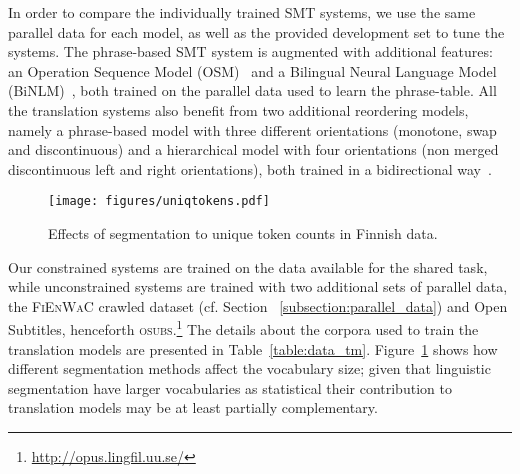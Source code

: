 \documentclass[postprint]{flammie}
\begin{document}
In order to compare the individually trained SMT systems, we use the same parallel data for each model, as well as the provided development set to tune the systems. The phrase-based SMT system is augmented with additional features: an Operation Sequence Model (OSM)~\cite{durrani2011joint} and a Bilingual Neural Language Model (BiNLM)~\cite{devlin2014binlm}, both trained on the parallel data used to learn the phrase-table. All the translation systems also benefit from two additional reordering models, namely a phrase-based model with three different orientations (monotone, swap and discontinuous) and a hierarchical model with four orientations (non merged discontinuous left and right orientations), both trained in a bidirectional way~\cite{koehn2005edinburgh,galley2008simple}.
%

\begin{figure}
\centering
\texttt{[image: figures/uniqtokens.pdf]}
	\caption{Effects of segmentation to unique token counts in Finnish data.
	\label{figure:segmentation_effects}
	}
\end{figure}
%

Our constrained systems are trained on the data available for the shared task, while unconstrained systems are trained with two additional sets of parallel data, the \textsc{FiEnWaC} crawled dataset (cf. Section ~\ref{subsection:parallel_data})
and Open Subtitles, henceforth \textsc{osubs}.\footnote{\url{http://opus.lingfil.uu.se/}} The details about the corpora used to train %
the translation models are presented in Table~\ref{table:data_tm}.  Figure~\ref{figure:segmentation_effects} shows how different segmentation methods affect the vocabulary size; given that linguistic segmentation have larger vocabularies as statistical their contribution to translation models may be at least partially complementary.
%
\end{document}
